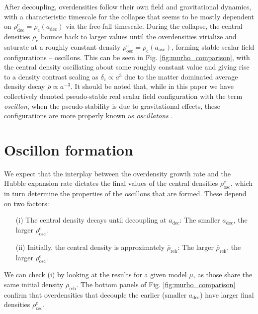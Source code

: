\documentclass[
    reprint,
    preprintnumbers,
    superscriptaddress,
    nofootinbib,
     amsmath,amssymb,
     aps,
     prd,
    floatfix,
    ]{revtex4-2}
\newcommand{\reh}{_\mathrm{reh}}
\newcommand{\rhoc}{\rho_\mathrm{c}}
\newcommand{\rhocdec}{\rho^\mathrm{c}_\mathrm{dec}}
\newcommand{\rhocosc}{\rho^\mathrm{c}_\mathrm{osc}}
\newcommand{\adec}{a_\mathrm{dec}}
\newcommand{\deltac}{\delta_\mathrm{c}}
\begin{document}
After decoupling, overdensities follow their own field and gravitational dynamics, with a characteristic timescale for the collapse that seems to be mostly dependent on $\rhocdec = \rhoc(\adec)$ via the free-fall timescale. During the collapse, the central densities $\rhoc$ bounce back to larger values until the overdensities virialize and saturate at a roughly constant density $\rhocosc=\rhoc(a_\mathrm{osc})$, forming stable scalar field configurations -- oscillons. This can be seen in Fig. \ref{fig:murho_comparison}, with the central density oscillating about some roughly constant value and giving rise to a density contrast scaling as $\deltac\propto a^3$ due to the matter dominated average density decay $\bar{\rho}\propto a^{-3}$. It should be noted that, while in this paper we have collectively denoted pseudo-stable real scalar field configuration with the term \textit{oscillon}, when the pseudo-stability is due to gravitational effects, these configurations are more properly known as \textit{oscillatons} \cite{Kaup:1968zz,Ruffini:1969qy,Hogan:1988mp,Seidel:1991zh,Liddle:1992fmk,Seidel:1993zk,Kolb:1993zz,Kolb:1993hw,Urena-Lopez:2002ptf,Urena-Lopez:2001zjo,Alcubierre:2003sx,Valdez-Alvarado:2011xnr,Urena-Lopez:2012udq,Krippendorf:2018tei,Ikeda:2017qev}. 


\section{Oscillon formation}
\label{sec:results-endpoint}


We expect that the interplay between the overdensity growth rate and the Hubble expansion rate dictates the final values of the central densities $\rhocosc$, which in turn determine the properties of the oscillons that are formed. These depend on two factors:
\begin{itemize}
    \item[(i)] The central density decays until decoupling at $\adec$: The smaller $\adec$, the larger $\rhocosc$.
    \item[(ii)] Initially, the central density is approximately $\bar{\rho}\reh$: The larger $\bar{\rho}\reh$, the larger $\rhocosc$.
\end{itemize}


We can check (i) by looking at the results for a given model $\mu$, as those share the same initial density $\bar{\rho}\reh$. The bottom panels of Fig. \ref{fig:murho_comparison} confirm that overdensities that decouple the earlier (smaller $\adec$) have larger final densities $\rhocosc$. 
\end{document}
